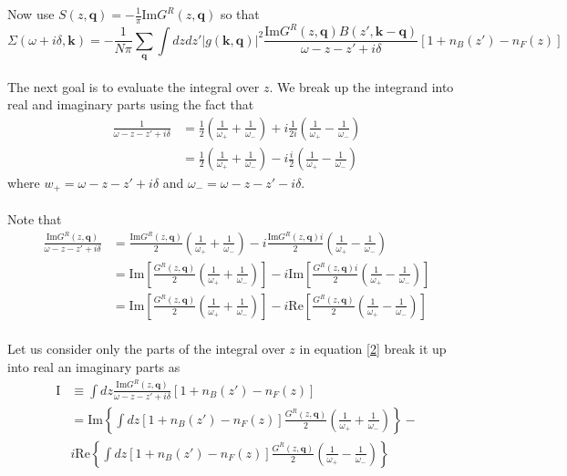 \documentclass[]{article}
\newcommand{\kk}{\mathbf{k}}
\newcommand{\qq}{\mathbf{q}}
\newcommand{\gs}{\left| g(\mathbf{k}, \mathbf{q}) \right|^2}
\newcommand{\imG}{\mathrm{Im} G^R(z,\qq)}
\begin{document}
Now use $S(z,\qq) = -\frac{1}{\pi} \mathrm{Im} G^R(z,\qq)$ so that
\begin{equation}
\label{2}
\Sigma(\omega+i\delta, \kk) = -\frac{1}{N\pi} \sum_\qq \int dz dz' \gs \frac{\imG B(z',\kk-\qq)}{\omega-z-z'+i\delta} \left[1 + n_B(z') - n_F(z)\right]
\end{equation}
\\
The next goal is to evaluate the integral over $z$. We break up the integrand into real and imaginary parts using the fact that
\begin{equation}
\begin{split}
\frac{1}{\omega-z-z'+i\delta} & = \frac{1}{2}\left(\frac{1}{\omega_+} + \frac{1}{\omega_-} \right) + i \frac{1}{2i} \left( \frac{1}{\omega_+} - \frac{1}{\omega_-} \right) 
\\ &= \frac{1}{2}\left(\frac{1}{\omega_+} + \frac{1}{\omega_-} \right) - i \frac{i}{2} \left( \frac{1}{\omega_+} - \frac{1}{\omega_-} \right)
\end{split}
\end{equation}
where $w_+ = \omega-z-z'+i\delta$ and $\omega_- = \omega-z-z'-i\delta$.
\\
\\
Note that 
\begin{equation}
\begin{split}
\frac{\imG}{\omega-z-z'+i\delta} &= \frac{\imG}{2}\left(\frac{1}{\omega_+} + \frac{1}{\omega_-}\right) - i  \frac{\imG i}{2} \left(\frac{1}{\omega_+} - \frac{1}{\omega_-}\right) \\
&= \mathrm{Im}\left[  \frac{G^R(z,\qq)}{2}\left(\frac{1}{\omega_+} + \frac{1}{\omega_-} \right) \right] - i \mathrm{Im}\left[\frac{G^R(z,\qq)i}{2} \left( \frac{1}{\omega_+} - \frac{1}{\omega_-} \right) \right] \\
& = \mathrm{Im}\left[  \frac{G^R(z,\qq)}{2}\left(\frac{1}{\omega_+} + \frac{1}{\omega_-} \right) \right] - i \mathrm{Re}\left[\frac{G^R(z,\qq)}{2} \left( \frac{1}{\omega_+} - \frac{1}{\omega_-} \right) \right]
\end{split}
\end{equation}
\\
Let us consider only the parts of the integral over $z$ in equation \ref{2} break it up into real an imaginary parts as
\begin{equation}
\begin{split}
\mathrm{I} & \equiv \int dz \frac{\imG}{\omega-z-z'+i\delta} \left[1 + n_B(z') - n_F(z)\right] \\
& = \mathrm{Im} \left\lbrace \int dz \left[1 + n_B(z') - n_F(z)\right] \frac{G^R(z,\qq)}{2}\left(\frac{1}{\omega_+} + \frac{1}{\omega_-} \right) \right\rbrace - \\
& i \mathrm{Re} \left\lbrace \int dz \left[1 + n_B(z') - n_F(z)\right] \frac{G^R(z,\qq)}{2} \left( \frac{1}{\omega_+} - \frac{1}{\omega_-} \right) \right\rbrace
\end{split}
\end{equation}
\\
\end{document}
